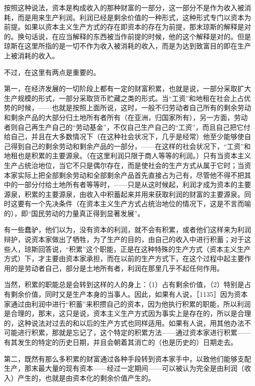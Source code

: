 按照这种说法，资本是构成收入的那种财富的一部分，这一部分不是作为收入被消耗，而是用来生产利润。利润已经是剩余价值的一种形式，这种形式专门以资本为前提。如果以资本主义生产方式的存在即资本的存在为前提，那末琼斯的解释是对的。换句话说，在应当解释的东西被当作前提的时候，他的这个解释是对的。但是琼斯在这里所指的是一切不作为收入被消耗的收入，而是为达到致富目的即在生产上被消耗的收入。

不过，在这里有两点是重要的。

第一，在经济发展的一切阶段上都有一定的财富积累，也就是说，一部分采取扩大生产规模的形式，一部分采取货币贮藏之类的形式。当“工资”和地租在社会上占优势的时候，——也就是按照上面所说，这时，一般不归劳动者自己所有的剩余劳动和剩余产品的大部分归土地所有者所有（在亚洲，归国家所有），另一方面，劳动者则自己再生产自己的“劳动基金”，不仅自己生产自己的“工资”，而且自己把它付给自己，并且在大多数情况下（在这种社会状况下，几乎是经常）他至少能够使自己得到自己的剩余劳动和剩余产品的一部分，——在这样的社会状况下，“工资”和地租也是积累的主要源泉。（在这里利润只限于商人等等的利润。）只有当资本主义生产占统治地位，当它不只是偶尔存在，而是使社会的生产方式从属于它时；当资本家实际上把全部剩余劳动和全部剩余产品首先直接占为己有，尽管他不得不把其中的一部分付给土地所有者等等时，——只是从这时候起，利润才成为资本的主要源泉，积累的主要源泉，由收入中积蓄起来并用来获取利润的财富的主要源泉。同时这要有一个先决条件（在资本主义生产方式占统治地位的情况下，这是不言而喻的），即“国民劳动的力量真正得到显著发展”。

有一些蠢驴，他们以为，没有资本的利润，就不会有积累，或者他们这样来为利润辩护，说资本家做出了牺牲，为了生产的目的，由自己的收入中进行积蓄；对于这些人，琼斯回答说，“积累”这个职能，正是在这种特殊的生产方式（资本主义生产方式）下，才主要由资本家承担，而在以前的生产方式下，在这个过程中起主要作用的是劳动者自己，部分是土地所有者，利润在那里几乎不起任何作用。

当然，积累的职能总是会转到这样的人的身上：（1）占有剩余价值，（2）特别是占有剩余价值，同时又是生产本身的当事人。因此，如果有人说，［1135］因为资本家通过由利润中进行“积蓄”来积攒自己的资本，因为他执行积累的职能，所以利润是合理的，那末，这只是说，资本主义生产方式因为事实上是存在的，所以是合理的，这种说法对过去的和以后的生产方式也同样适用。如果有人说，用其他办法不可能进行积累，那就是忘记了，这个特定的积累方法——通过资本家进行积累——有其发生的特定的历史日期，并且会朝着其消亡的（也是历史的）日期走去。

第二，既然有那么多积累的财富通过各种手段转到资本家手中，以致他们能够支配生产，那末最大量的现有资本——经过一定期间——可以被认为完全是由利润（收入）产生的，也就是由资本化的剩余价值产生的。

